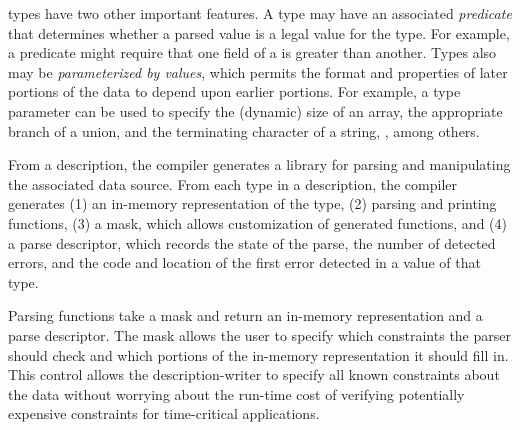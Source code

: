 \pads{} types have two other important features.  A type may have an
associated \emph{predicate} that determines whether a parsed value is
a legal value for the type.  For example, a predicate might require
that one field of a  is greater than another.  Types also
may be \emph{parameterized by values}, which permits the format and
properties of later portions of the data to depend upon earlier
portions.  For example, a type parameter can be used to specify the
(dynamic) size of an array, the appropriate branch of a union, and the
terminating character of a string, \eg{} , among
others.



From a description, the \pads{} compiler generates a \C{} library for
parsing and manipulating the associated data source.  From each type
in a \pads{} description, the compiler generates (1) an in-memory
representation of the type, (2) parsing and printing functions, (3) a
mask, which allows customization of generated functions, and (4) a
parse descriptor, which records the state of the parse, the number of
detected errors, and the code and location of the first error detected
in a value of that type.

Parsing functions take a mask and return an in-memory representation
and a parse descriptor.  The mask allows the user to specify which
constraints the parser should check and which portions of the
in-memory representation it should fill in.  This control allows the
description-writer to specify all known constraints about the data
without worrying about the run-time cost of verifying potentially
expensive constraints for time-critical applications.

